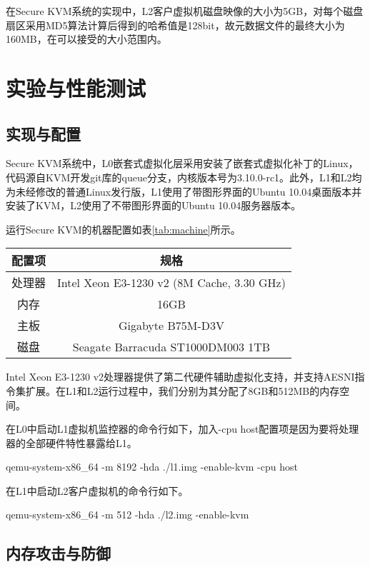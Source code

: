 在Secure KVM系统的实现中，L2客户虚拟机磁盘映像的大小为5GB，对每个磁盘扇区采用MD5算法计算后得到的哈希值是128bit，故元数据文件的最终大小为160MB，在可以接受的大小范围内。

\section{实验与性能测试}

\subsection{实现与配置}

Secure KVM系统中，L0嵌套式虚拟化层采用安装了嵌套式虚拟化补丁的Linux，代码源自KVM开发git库的queue分支，内核版本号为3.10.0-rc1。此外，L1和L2均为未经修改的普通Linux发行版，L1使用了带图形界面的Ubuntu 10.04桌面版本并安装了KVM，L2使用了不带图形界面的Ubuntu 10.04服务器版本。

运行Secure KVM的机器配置如表\ref{tab:machine}所示。

\begin{table}[htpb]
\centering
\begin{tabular}{cc}
\toprule
配置项	& 规格\\
\midrule
处理器	& Intel Xeon E3-1230 v2 (8M Cache, 3.30 GHz)\\
内存	& 16GB\\
主板	& Gigabyte B75M-D3V\\
磁盘  & Seagate Barracuda ST1000DM003 1TB\\
\bottomrule
\end{tabular}
\end{table}

Intel Xeon E3-1230 v2处理器提供了第二代硬件辅助虚拟化支持，并支持AESNI指令集扩展。在L1和L2运行过程中，我们分别为其分配了8GB和512MB的内存空间。

在L0中启动L1虚拟机监控器的命令行如下，加入-cpu host配置项是因为要将处理器的全部硬件特性暴露给L1。

qemu-system-x86\_64 -m 8192 -hda ./l1.img -enable-kvm -cpu host

在L1中启动L2客户虚拟机的命令行如下。

qemu-system-x86\_64 -m 512 -hda ./l2.img -enable-kvm

\subsection{内存攻击与防御}

